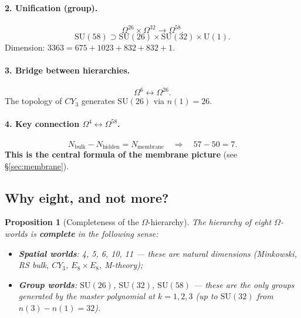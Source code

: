 \documentclass[11pt,a4paper]{article}
\newcommand{\SU}{\mathrm{SU}}
\newcommand{\CY}{CY_3}
\newcommand{\Om}{\Omega^4}
\newcommand{\Oms}{\Omega^6}
\newcommand{\Omtw}{\Omega^{26}}
\newcommand{\Omth}{\Omega^{32}}
\newcommand{\Omfi}{\Omega^{58}}
\newcommand{\Nbulk}{N_{\text{bulk}}}
\newcommand{\Nhidden}{N_{\text{hidden}}}
\newcommand{\Nmembrane}{N_{\text{membrane}}}
\newtheorem{proposition}[theorem]{Proposition}
\theoremstyle{definition}
\begin{document}
\paragraph{2. Unification (group).}
\begin{equation}
    \Omtw \times \Omth \to \Omfi.
\end{equation}
\begin{equation}
    \SU(58) \supset \SU(26) \times \SU(32) \times \mathrm{U}(1).
\end{equation}
Dimension: $3363 = 675 + 1023 + 832 + 832 + 1$.

\paragraph{3. Bridge between hierarchies.}
\begin{equation}
    \Oms \leftrightarrow \Omtw.
\end{equation}
The topology of $\CY$ generates $\SU(26)$ via $n(1) = 26$.

\paragraph{4. Key connection $\Om \leftrightarrow \Omfi$.}
\begin{equation}
    \boxed{
    \Nbulk - \Nhidden = \Nmembrane
    \quad\Longrightarrow\quad
    57 - 50 = 7.
    }
    \label{eq:field-balance}
\end{equation}
\textbf{This is the central formula of the membrane picture} 
(see §\ref{sec:membrane}).

\subsection{Why eight, and not more?}
\label{subsec:why-eight}

\begin{proposition}[Completeness of the $\Omega$-hierarchy]
\label{prop:completeness}
The hierarchy of eight $\Omega$-worlds is \textbf{complete} in the following 
sense:
\begin{itemize}
    \item \textbf{Spatial worlds}: 4, 5, 6, 10, 11 — 
          these are \emph{natural} dimensions (Minkowski, 
          RS bulk, $\CY$, $E_8 \times E_8$, M-theory);
    \item \textbf{Group worlds}: $\SU(26)$, $\SU(32)$, 
          $\SU(58)$ — these are the \emph{only} groups generated by the 
          master polynomial at $k = 1, 2, 3$ (up to 
          $\SU(32)$ from $n(3) - n(1) = 32$).
\end{itemize}
\end{proposition}
\end{document}
